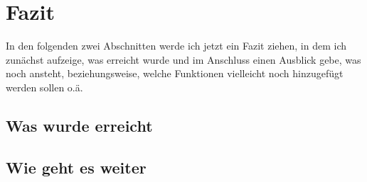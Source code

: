 \section{Fazit}
In den folgenden zwei Abschnitten werde ich jetzt ein Fazit ziehen, in dem ich zunächst aufzeige, was erreicht wurde und 
im Anschluss einen Ausblick gebe, was noch ansteht, beziehungsweise, welche Funktionen vielleicht noch hinzugefügt werden sollen o.ä.
\subsection{Was wurde erreicht}

\subsection{Wie geht es weiter}